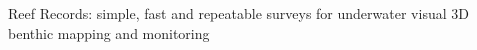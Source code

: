 Reef Records: simple, fast and repeatable surveys for underwater visual 3D benthic mapping and monitoring